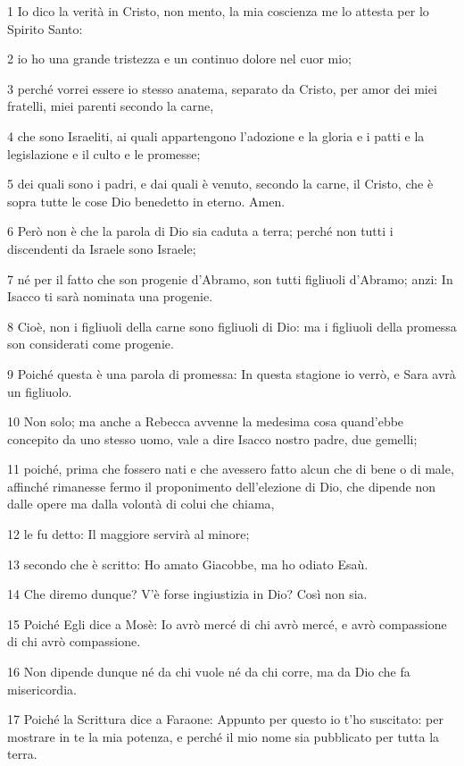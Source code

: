 \par 1 Io dico la verità in Cristo, non mento, la mia coscienza me lo attesta per lo Spirito Santo:
\par 2 io ho una grande tristezza e un continuo dolore nel cuor mio;
\par 3 perché vorrei essere io stesso anatema, separato da Cristo, per amor dei miei fratelli, miei parenti secondo la carne,
\par 4 che sono Israeliti, ai quali appartengono l'adozione e la gloria e i patti e la legislazione e il culto e le promesse;
\par 5 dei quali sono i padri, e dai quali è venuto, secondo la carne, il Cristo, che è sopra tutte le cose Dio benedetto in eterno. Amen.
\par 6 Però non è che la parola di Dio sia caduta a terra; perché non tutti i discendenti da Israele sono Israele;
\par 7 né per il fatto che son progenie d'Abramo, son tutti figliuoli d'Abramo; anzi: In Isacco ti sarà nominata una progenie.
\par 8 Cioè, non i figliuoli della carne sono figliuoli di Dio: ma i figliuoli della promessa son considerati come progenie.
\par 9 Poiché questa è una parola di promessa: In questa stagione io verrò, e Sara avrà un figliuolo.
\par 10 Non solo; ma anche a Rebecca avvenne la medesima cosa quand'ebbe concepito da uno stesso uomo, vale a dire Isacco nostro padre, due gemelli;
\par 11 poiché, prima che fossero nati e che avessero fatto alcun che di bene o di male, affinché rimanesse fermo il proponimento dell'elezione di Dio, che dipende non dalle opere ma dalla volontà di colui che chiama,
\par 12 le fu detto: Il maggiore servirà al minore;
\par 13 secondo che è scritto: Ho amato Giacobbe, ma ho odiato Esaù.
\par 14 Che diremo dunque? V'è forse ingiustizia in Dio? Così non sia.
\par 15 Poiché Egli dice a Mosè: Io avrò mercé di chi avrò mercé, e avrò compassione di chi avrò compassione.
\par 16 Non dipende dunque né da chi vuole né da chi corre, ma da Dio che fa misericordia.
\par 17 Poiché la Scrittura dice a Faraone: Appunto per questo io t'ho suscitato: per mostrare in te la mia potenza, e perché il mio nome sia pubblicato per tutta la terra.
